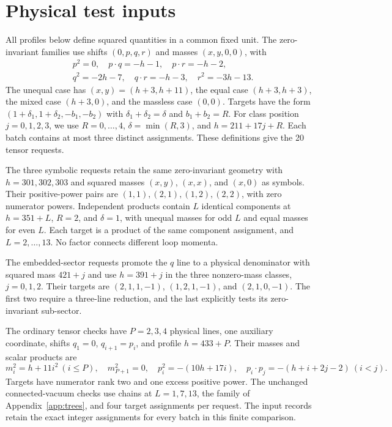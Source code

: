 \section{Physical test inputs}
\label{app:families-new}
All profiles below define squared quantities in a common fixed unit. The zero-invariant families use shifts $(0,p,q,r)$ and masses $(x,y,0,0)$, with
\begin{align}
 &p^2=0,\quad p\cdot q=-h-1,\quad p\cdot r=-h-2,\nonumber\\
 &q^2=-2h-7,\quad q\cdot r=-h-3,\quad r^2=-3h-13.
 \label{eq:light-input}
\end{align}
The unequal case has $(x,y)=(h+3,h+11)$, the equal case $(h+3,h+3)$, the mixed case $(h+3,0)$, and the massless case $(0,0)$. Targets have the form $(1+\delta_1,1+\delta_2,-b_1,-b_2)$ with $\delta_1+\delta_2=\delta$ and $b_1+b_2=R$. For class position $j=0,1,2,3$, we use $R=0,\ldots,4$, $\delta=\min(R,3)$, and $h=211+17j+R$. Each batch contains at most three distinct assignments. These definitions give the 20 tensor requests.

The three symbolic requests retain the same zero-invariant geometry with $h=301,302,303$ and squared masses $(x,y)$, $(x,x)$, and $(x,0)$ as symbols. Their positive-power pairs are $(1,1),(2,1),(1,2),(2,2)$, with zero numerator powers. Independent products contain $L$ identical components at $h=351+L$, $R=2$, and $\delta=1$, with unequal masses for odd $L$ and equal masses for even $L$. Each target is a product of the same component assignment, and $L=2,\ldots,13$. No factor connects different loop momenta.

The embedded-sector requests promote the $q$ line to a physical denominator with squared mass $421+j$ and use $h=391+j$ in the three nonzero-mass classes, $j=0,1,2$. Their targets are $(2,1,1,-1)$, $(1,2,1,-1)$, and $(2,1,0,-1)$. The first two require a three-line reduction, and the last explicitly tests its zero-invariant sub-sector.

The ordinary tensor checks have $P=2,3,4$ physical lines, one auxiliary coordinate, shifts $q_1=0$, $q_{i+1}=p_i$, and profile $h=433+P$. Their masses and scalar products are
\begin{equation}
 m_i^2=h+11i^2\ (i\leq P),\quad m_{P+1}^2=0,\quad
 p_i^2=-(10h+17i),\quad p_i\cdot p_j=-(h+i+2j-2)\ (i<j).
 \label{eq:ordinary-input}
\end{equation}
Targets have numerator rank two and one excess positive power. The unchanged connected-vacuum checks use chains at $L=1,7,13$, the family of Appendix~\ref{app:trees}, and four target assignments per request. The input records retain the exact integer assignments for every batch in this finite comparison.

